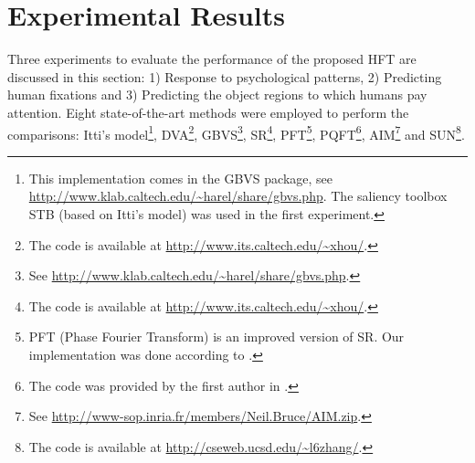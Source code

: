 \documentclass[10pt,journal,cspaper,compsoc]{IEEEtran}
\begin{document}
\section{Experimental Results}
\label{Sec:Experiment}

Three experiments to evaluate the performance of the proposed HFT are discussed in this section: 1) Response to psychological patterns, 2) Predicting human fixations and 3) Predicting the object regions to which humans pay attention. Eight state-of-the-art methods were employed to perform the comparisons: Itti's model\cite{Itti_etal98pami}\footnote{This implementation comes in the GBVS package, see \url{http://www.klab.caltech.edu/~harel/share/gbvs.php}. The saliency toolbox STB (based on Itti's model) was used in the first experiment.}, DVA\cite{NIPS2008_0142}\footnote{The code is available at \url{http://www.its.caltech.edu/~xhou/}.}, GBVS\cite{NIPS2006_897}\footnote{ See \url{http://www.klab.caltech.edu/~harel/share/gbvs.php}.}, SR\cite{hou2007saliency}\footnote{The code is available at \url{http://www.its.caltech.edu/~xhou/}.}, PFT\cite{guo2008spatio}\footnote{PFT (Phase Fourier Transform) is an improved version of SR. Our implementation was done according to \cite{guo2008spatio}.}, PQFT\cite{guo2008spatio,guo2010multiresolution}\footnote{The code was provided by the first author in \cite{guo2010multiresolution}.}, AIM\cite{NIPS2005_81}\footnote{
See \url{http://www-sop.inria.fr/members/Neil.Bruce/AIM.zip}.} and SUN\cite{zhang2008sun}\footnote{The code is available at \url{http://cseweb.ucsd.edu/~l6zhang/}.}.
\end{document}
